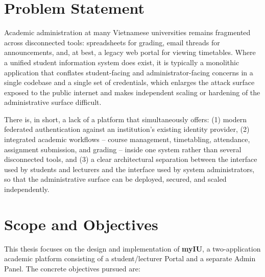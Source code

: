 \documentclass[12pt,a4paper]{report}
\begin{document}
\section{Problem Statement}

Academic administration at many Vietnamese universities remains
fragmented across disconnected tools: spreadsheets for grading, email
threads for announcements, and, at best, a legacy web portal for
viewing timetables. Where a unified student information system does
exist, it is typically a monolithic application that conflates
student-facing and administrator-facing concerns in a single codebase
and a single set of credentials, which enlarges the attack surface
exposed to the public internet and makes independent scaling or
hardening of the administrative surface difficult.

There is, in short, a lack of a platform that simultaneously offers:
(1) modern federated authentication against an institution's existing
identity provider, (2) integrated academic workflows -- course
management, timetabling, attendance, assignment submission, and
grading -- inside one system rather than several disconnected tools,
and (3) a clear architectural separation between the interface used by
students and lecturers and the interface used by system administrators,
so that the administrative surface can be deployed, secured, and scaled
independently.

\section{Scope and Objectives}

This thesis focuses on the design and implementation of \textbf{myIU},
a two-application academic platform consisting of a student/lecturer
Portal and a separate Admin Panel. The concrete objectives pursued are:
\end{document}
